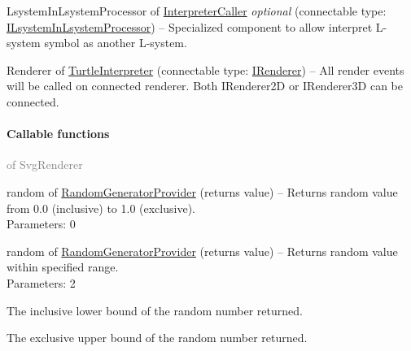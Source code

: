 \begin{description*}
		\item[LsystemInLsystemProcessor] of \hyperref[Malsys.Processing.Components.Interpreters.InterpreterCaller]{InterpreterCaller}
 \textit{optional} 		(connectable type: \hyperref[Malsys.Processing.Components.Common.ILsystemInLsystemProcessor]{ILsystemInLsystemProcessor})
			-- Specialized component to allow interpret L-system symbol as another L-system.
		\item[Renderer] of \hyperref[Malsys.Processing.Components.Interpreters.TurtleInterpreter]{TurtleInterpreter}
		(connectable type: \hyperref[Malsys.Processing.Components.IRenderer]{IRenderer})
			-- All render events will be called on connected renderer.
            Both IRenderer2D or IRenderer3D can be connected.
	\end{description*}
	\paragraph{Callable functions}\textcolor{gray}{of SvgRenderer}
	\begin{description*}
		\item[random] of \hyperref[Malsys.Processing.Components.Common.RandomGeneratorProvider]{RandomGeneratorProvider}
		(returns value)
			-- Returns random value from 0.0 (inclusive) to 1.0 (exclusive).
		\\ Parameters: 0
		\item[random] of \hyperref[Malsys.Processing.Components.Common.RandomGeneratorProvider]{RandomGeneratorProvider}
		(returns value)
			-- Returns random value within specified range.
		\\ Parameters: 2
			\begin{enumerate*}
				\item The inclusive lower bound of the random number returned.
				\item             The exclusive upper bound of the random number returned.
			\end{enumerate*}
	\end{description*}
